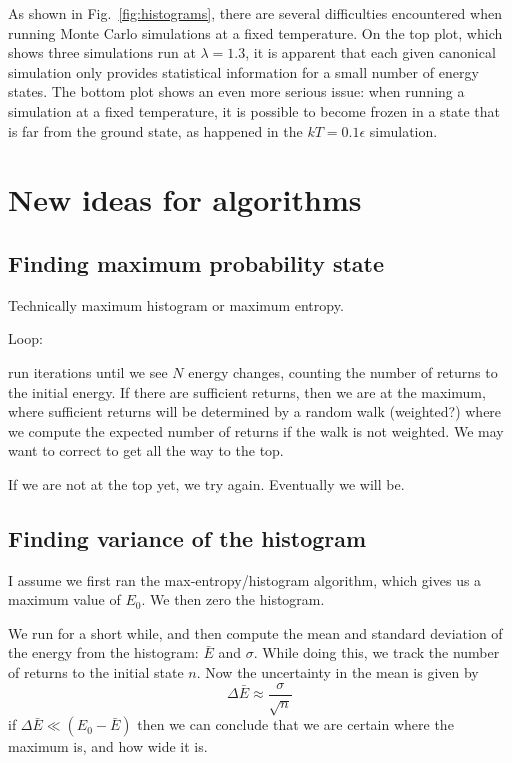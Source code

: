 \documentclass[letterpaper,twocolumn,amsmath,amssymb,pre,aps,10pt]{revtex4-1}
\begin{document}
As shown in Fig.~\ref{fig:histograms}, there are several difficulties
encountered when running Monte Carlo simulations at a fixed
temperature.  On the top plot, which shows three simulations run at
$\lambda = 1.3$, it is apparent that each given canonical simulation
only provides statistical information for a small number of energy
states.  The bottom plot shows an even more serious issue:  when
running a simulation at a fixed temperature, it is possible to become
frozen in a state that is far from the ground state, as happened in
the $kT=0.1\epsilon$ simulation.

\section{New ideas for algorithms}

\subsection{Finding maximum probability state}

Technically maximum histogram or maximum entropy.

Loop:

run iterations until we see $N$ energy changes, counting the number of
returns to the initial energy.  If there are sufficient returns, then
we are at the maximum, where sufficient returns will be determined by
a random walk (weighted?) where we compute the expected number of
returns if the walk is not weighted.  We may want to correct to get
all the way to the top.

If we are not at the top yet, we try again.  Eventually we will be.

\subsection{Finding variance of the histogram}

I assume we first ran the max-entropy/histogram algorithm, which gives
us a maximum value of $E_0$.  We then zero the histogram.

We run for a short while, and then compute the mean and standard
deviation of the energy from the histogram: $\bar E$ and $\sigma$.
While doing this, we track the number of returns to the initial state
$n$.  Now the uncertainty in the mean is given by
\begin{equation}
  \Delta \bar E \approx \frac{\sigma}{\sqrt{n}}
\end{equation}
if $\Delta \bar E \ll (E_0 - \bar E)$ then we can conclude that we are
certain where the maximum is, and how wide it is.
\end{document}
